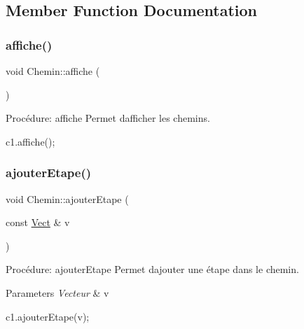 \subsection{Member Function Documentation}
\mbox{\label{classChemin_aca468327c0fc8ce57727bc13edfa741e}} 
\subsubsection{\texorpdfstring{affiche()}{affiche()}}
{\footnotesize\ttfamily void Chemin\+::affiche (\begin{DoxyParamCaption}{ }\end{DoxyParamCaption})}



Procédure\+: affiche Permet d\textquotesingle{}afficher les chemins. 


\begin{DoxyCode}
c1.affiche();
\end{DoxyCode}
 \mbox{\label{classChemin_a4cdbe032bca015c52dccbef4fa2cb647}} 
\subsubsection{\texorpdfstring{ajouter\+Etape()}{ajouterEtape()}}
{\footnotesize\ttfamily void Chemin\+::ajouter\+Etape (\begin{DoxyParamCaption}\item[{const \hyperlink{classVect}{Vect} \&}]{v }\end{DoxyParamCaption})}



Procédure\+: ajouter\+Etape Permet d\textquotesingle{}ajouter une étape dans le chemin. 


\begin{DoxyParams}{Parameters}
{\em Vecteur} & v 
\begin{DoxyCode}
c1.ajouterEtape(v);
\end{DoxyCode}
 \\
\hline
\end{DoxyParams}
\mbox{\label{classChemin_ad01a7ae60fd0b51cc18281c031ea9c97}} 
